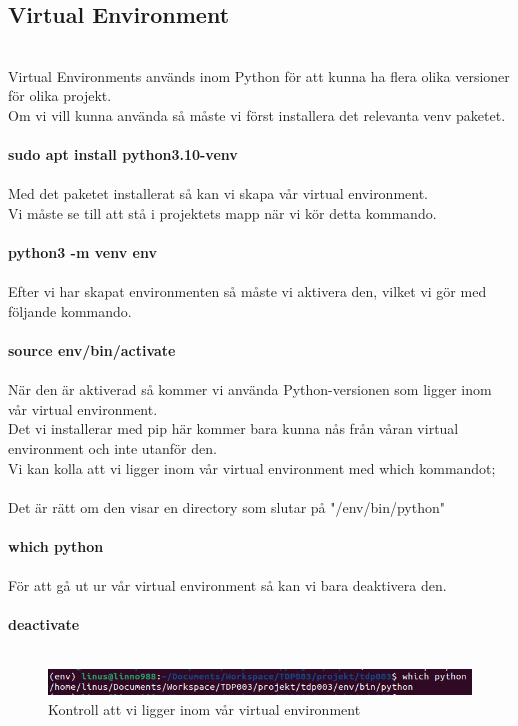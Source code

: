 \documentclass{TDP003mall}
\begin{document}
\subsection{Virtual Environment}\\
Virtual Environments används inom Python för att kunna ha flera olika versioner för olika projekt.\\
Om vi vill kunna använda så måste vi först installera det relevanta venv paketet.\\\\
\textbf{sudo apt install python3.10-venv}\\\\
Med det paketet installerat så kan vi skapa vår virtual environment.\\
Vi måste se till att stå i projektets mapp när vi kör detta kommando.\\\\
\textbf{python3 -m venv env}\\\\
Efter vi har skapat environmenten så måste vi aktivera den, vilket vi gör med följande kommando.\\\\
\textbf{source env/bin/activate}\\\\
När den är aktiverad så kommer vi använda Python-versionen som ligger inom vår virtual environment.\\
Det vi installerar med pip här kommer bara kunna nås från våran virtual environment och inte utanför den.\\
Vi kan kolla att vi ligger inom vår virtual environment med which kommandot;\\\\
Det är rätt om den visar en directory som slutar på "/env/bin/python"\\\\
\textbf{which python}\\\\
För att gå ut ur vår virtual environment så kan vi bara deaktivera den.\\\\
\textbf{deactivate}\\\\
\begin{figure}[h]
  \centering
  \includegraphics[scale=0.5]{venv_check}
  \caption{\label{fig:The-caption} Kontroll att vi ligger inom vår virtual environment}
\end{figure}
\end{document}
